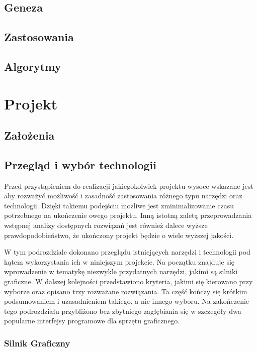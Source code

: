 \documentclass[11pt]{mwrep}
\begin{document}
  \section{Geneza}
    
  \section{Zastosowania}
  \section{Algorytmy}

\chapter{Projekt}

  \section{Założenia}

  \section{Przegląd i wybór technologii}

    Przed przystąpieniem do realizacji jakiegokolwiek projektu wysoce wskazane jest aby rozważyć możliwość i zasadność zastosowania różnego typu narzędzi oraz technologii. Dzięki takiemu podejściu możliwe jest zminimalizowanie czasu potrzebnego na ukończenie owego projektu. Inną istotną zaletą przeprowadzania wstępnej analizy dostępnych rozwiązań jest również dalece wyższe prawdopodobieństwo, że ukończony projekt będzie o wiele wyższej jakości.
  
    W tym podrozdziale dokonano przeglądu istniejących narzędzi i technologii pod kątem wykorzystania ich w niniejszym projekcie. Na początku znajduje się wprowadzenie w tematykę niezwykle przydatnych narzędzi, jakimi są silniki graficzne. W dalszej kolejności przedstawiono kryteria, jakimi się kierowano przy wyborze oraz opisano trzy rozważane rozwiązania. Ta część kończy się krótkim podsumowaniem i uzasadnieniem takiego, a nie innego wyboru. Na zakończenie tego podrozdziału przybliżono bez zbytniego zagłębiania się w szczegóły dwa popularne interfejsy programowe dla sprzętu graficznego.

    \subsection{Silnik Graficzny}
\end{document}
